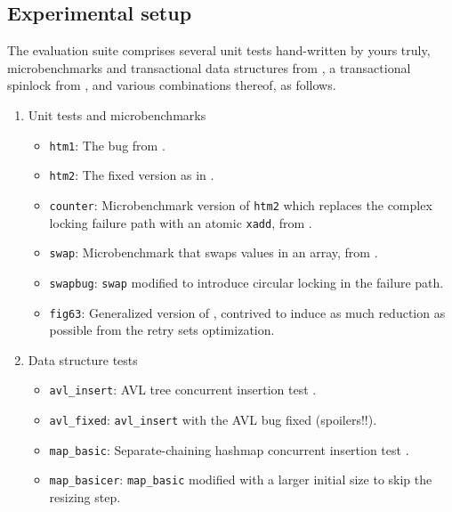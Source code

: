\subsection{Experimental setup}
\label{sec:tm-eval-exp-setup}

The evaluation suite comprises several unit tests hand-written by yours truly,
microbenchmarks and transactional data structures from \cite{tm-benchmark-cmu},
a transactional spinlock from \cite{spinlock-rtm-github},
and various combinations thereof,
as follows.


\begin{enumerate}
	\item Unit tests and microbenchmarks
	\begin{itemize}
		\item {\tt htm1}: The bug from .
		\item {\tt htm2}: The fixed version as in .
		\item {\tt counter}: Microbenchmark version of {\tt htm2} which replaces the complex locking failure path with an atomic {\tt xadd}, from \cite{tm-benchmark-cmu}.
		\item {\tt swap}: Microbenchmark that swaps values in an array, from \cite{tm-benchmark-cmu}.
		\item {\tt swapbug}: {\tt swap} modified to introduce circular locking in the failure path. %
		\item {\tt fig63}: Generalized version of ,
			contrived to induce as much reduction as possible from the retry sets optimization.
	\end{itemize}
	\item Data structure tests
	\begin{itemize}
		\item {\tt avl\_insert}: AVL tree concurrent insertion test \cite{tm-benchmark-cmu}.
		\item {\tt avl\_fixed}: {\tt avl\_insert} with the AVL bug fixed (spoilers!!).
		\item {\tt map\_basic}: Separate-chaining hashmap concurrent insertion test \cite{tm-benchmark-cmu}.
		\item {\tt map\_basicer}: {\tt map\_basic} modified with a larger initial size to skip the resizing step.

\end{itemize}
\end{enumerate}
